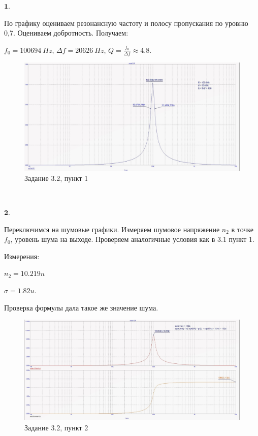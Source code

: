 \documentclass[a4paper, 14pt]{extarticle}%
\begin{document}
$\textbf{1.}$


По графику оцениваем резонансную частоту и полосу пропускания по уровню 0,7. Оцениваем добротность. Получаем:

$f_0 = 100694 \: Hz$, $\Delta f = 20626 \: Hz$, $Q = \frac{f_0}{\Delta f} \approx 4.8$.

\begin{figure}[h!]
			\centering
			\includegraphics[width=1.1\linewidth]{3/3_2_1.jpg}
			\caption{Задание 3.2, пункт 1}
			\label{A}
\end{figure}

$ $

$\textbf{2.}$

Переключимся на шумовые графики. Измеряем шумовое напряжение $n_2$ в точке $f_0$, уровень шума на выходе.
Проверяем аналогичные условия как в 3.1 пункт 1.

Измерения:

$n_2 = 10.219n$

$\sigma = 1.82u$.

Проверка формулы дала такое же значение шума.


\begin{figure}[h!]
			\centering
			\includegraphics[width=1.1\linewidth]{3/3_2_2.jpg}
			\caption{Задание 3.2, пункт 2}
			\label{A}
\end{figure}
\end{document}
